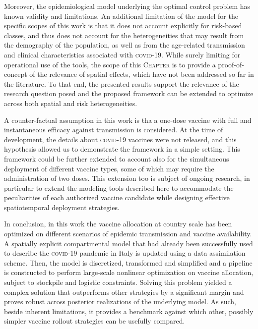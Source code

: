 Moreover, the epidemiological model underlying the optimal control problem has known validity and limitations\cite[-3\baselineskip]{Gatto:SpreadDynamicsCOVID19:2020, Bertuzzo:GeographyCOVID19Spread:2020}. An additional limitation of the model for the specific scopes of this work is that it does not account explicitly for risk-based classes, and thus does not account for the heterogeneities that may result from the demography of the population, as well as from the age-related transmission and clinical characteristics associated with \textsc{covid}-19. While surely limiting for operational use of the tools, the scope of this \textsc{Chapter} is to provide a proof-of-concept of the relevance of spatial effects, which have not been addressed so far in the literature. To that end, the presented results support the relevance of the research question posed and the proposed framework can be extended to optimize across both spatial and risk heterogeneities. 

A counter-factual assumption in this work is tha a one-dose vaccine with full and instantaneous efficacy against transmission is considered. At the time of development, the details about \textsc{covid}-19 vaccines were not released, and this hypothesis allowed us to demonstrate the framework in a simple setting. This framework could be further extended to account also for the simultaneous deployment of different vaccine types, some of which may require the administration of two doses. This extension too is subject of ongoing research, in particular to extend the modeling tools described here to accommodate the peculiarities of each authorized vaccine candidate while designing effective spatiotemporal deployment strategies.

In conclusion, in this work the vaccine allocation at country scale has been optimized on different scenarios of epidemic transmission and vaccine availability. A spatially explicit compartmental model that had already been successfully used to describe the \textsc{covid}-19 pandemic in Italy is updated using a data assimilation scheme. Then, the model is  discretized, transformed and simplified and a pipeline is constructed to perform large-scale nonlinear optimization on vaccine allocation, subject to stockpile and logistic constraints. Solving this problem yielded a complex solution that outperforms other strategies by a significant margin and proves robust across posterior realizations of the underlying model. As such, beside inherent limitations, it provides a benchmark against which other, possibly simpler vaccine rollout strategies can be usefully compared.

